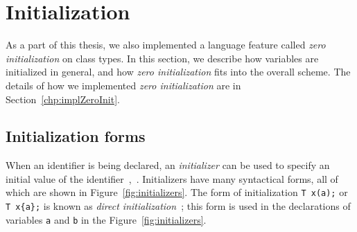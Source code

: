 \documentclass[nolot,nolof,nocover,printed]{fithesis3}
\newcommand{\stdN}[2]{\cite[#2]{#1}\xspace}
\begin{document}
%
%
%
%


\section{Initialization} \label{chap:lang:init}
As a part of this thesis, we also implemented a language feature called \textit{zero initialization} on class types. In this section, we describe how variables are initialized in general, and how \textit{zero initialization} fits into the overall scheme. The details of how we implemented \textit{zero initialization} are in Section~\ref{chp:implZeroInit}.

\subsection{Initialization forms}
When an identifier is being declared, an \textit{initializer} can be used to specify an initial value of the identifier~\stdN{n4296}{\S 8.5/1},~\stdN{n4700}{\S 11.6/1}. Initializers have many syntactical forms, all of which are shown in Figure~\ref{fig:initializers}. The form of initialization \lstinline|T x(a);| or \lstinline|T x{a};| is known as \textit{direct initialization}~\stdN{n4296}{\S 8.5/16}; this form is used in the declarations of variables \texttt{a} and \texttt{b} in the Figure~\ref{fig:initializers}.
\end{document}
